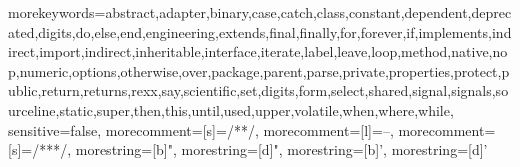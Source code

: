 {morekeywords={abstract,adapter,binary,case,catch,class,constant,dependent,deprecated,digits,do,else,end,engineering,extends,final,finally,for,forever,if,implements,indirect,import,indirect,inheritable,interface,iterate,label,leave,loop,method,native,nop,numeric,options,otherwise,over,package,parent,parse,private,properties,protect,public,return,returns,rexx,say,scientific,set,digits,form,select,shared,signal,signals,sourceline,static,super,then,this,until,used,upper,volatile,when,where,while},
sensitive=false,
morecomment=[s]={/*}{*/},
morecomment=[l]={--},
morecomment=[s]={/**}{*/},
morestring=[b]",
morestring=[d]",
morestring=[b]',
morestring=[d]'}

